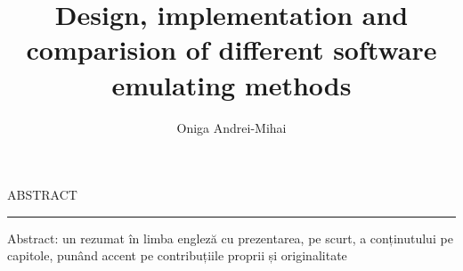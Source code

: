 \documentclass[12pt]{scrreport}
\begin{document}
\title{Design, implementation and comparision of different software emulating methods}					   
\author{Oniga Andrei-Mihai}											
				
\maketitle


\newpage
\thispagestyle{empty}
\mbox{}
\newpage
{}

\cleardoublepage
ABSTRACT
\vspace{0.5cm}	
\hrule
\vspace{0.5cm}	

Abstract: un rezumat în limba engleză cu prezentarea, pe scurt, a conținutului pe capitole, punând accent pe contribuțiile proprii și originalitate

\tableofcontents

\newpage
{}








\end{document}
